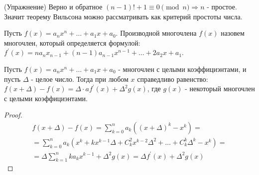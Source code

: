     (Упражнение) Верно и обратное $(n-1)!+1\equiv 0\pmod{n} \Rightarrow n$ - простое.\\
    Значит теорему Вильсона можно рассматривать как критерий простоты числа.
    \begin{definition}
        Пусть $f(x)=a_n x^n+\dots+a_1 x+a_0$. Производной многочлена $f(x)$ назовем многочлен, который определяется формулой:\\
        $f^{\prime}(x)=na_n x_{n-1}+(n-1)a_{n-1}x^{n-1}+\dots+2a_2x+a_1$. 
    \end{definition} 
    \begin{lemma}\label{lemma9.1}
        Пусть $f(x)=a_nx^n+ \dots +a_1 x+a_0$ - многочлен с целыми коэффициэнтами, и пусть $\Delta$ - целое число. Тогда при любом $x$ справедливо равенство: $f(x+\Delta)-f(x)=\Delta\cdot a f^{\prime}(x)+\Delta^2g(x)$, где $g(x)$ - некоторый многочлен с целыми коэффициэнтами.
    \end{lemma} 
    \begin{proof}
        \begin{multline*}
            f(x+\Delta)-f(x)=\sum\limits_{k=0}^{n}a_k((x+\Delta)^k-x^k)=\\
            =\sum\limits_{k=0}^{n}a_k(x^k+kx^{k-1}\Delta+C_k^2 x^{k-2}\Delta^2+ \dots + C_k^k \Delta^k-x^k)=\\
            =\Delta \sum\limits_{k=1}^{n} k a_k x^{k-1}+\Delta^2 g(x)=\Delta f^{\prime}(x)+\Delta^2g(x)
        \end{multline*}
    \end{proof}
